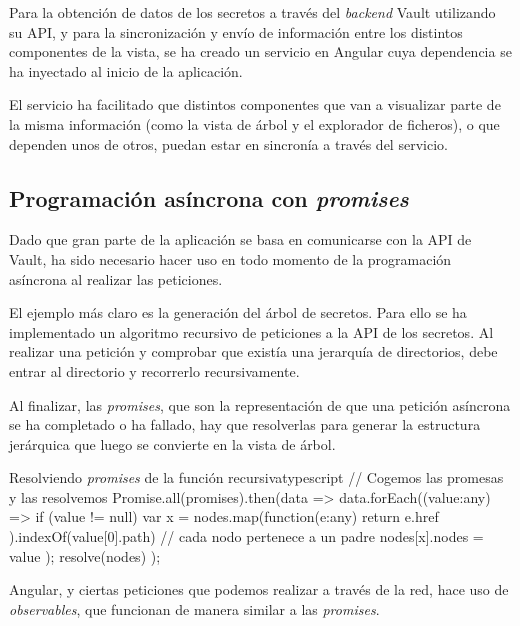 \documentclass{\ClassPath/viu-tfm-template}
\begin{document}
Para la obtención de datos de los secretos a través del \textit{backend} Vault utilizando su API, y para la sincronización y envío de información entre los distintos componentes de la vista, se ha creado un servicio en Angular cuya dependencia se ha inyectado al inicio de la aplicación.

El servicio ha facilitado que distintos componentes que van a visualizar parte de la misma información (como la vista de árbol y el explorador de ficheros), o que dependen unos de otros, puedan estar en sincronía a través del servicio.


\subsection{Programación asíncrona con \textit{promises}}

Dado que gran parte de la aplicación se basa en comunicarse con la API de Vault, ha sido necesario hacer uso en todo momento de la programación asíncrona al realizar las peticiones.

El ejemplo más claro es la generación del árbol de secretos. Para ello se ha implementado un algoritmo recursivo de peticiones a la API de los secretos. Al realizar una petición y comprobar que existía una jerarquía de directorios, debe entrar al directorio y recorrerlo recursivamente.

Al finalizar, las \textit{promises}, que son la representación de que una petición asíncrona se ha completado o ha fallado, hay que resolverlas para generar la estructura jerárquica que luego se convierte en la vista de árbol.

\begin{mycode}{Resolviendo \textit{promises} de la función recursiva}{typescript}{}
// Cogemos las promesas y las resolvemos
Promise.all(promises).then(data => {
    data.forEach((value:any) => {
        if (value != null){
            var x = nodes.map(function(e:any){
                return e.href
            }).indexOf(value[0].path)
            // cada nodo pertenece a un padre
            nodes[x].nodes = value
        }
    });
    resolve(nodes)
});
\end{mycode}

Angular, y ciertas peticiones que podemos realizar a través de la red, hace uso de \textit{observables}, que funcionan de manera similar a las \textit{promises}.

\end{document}
